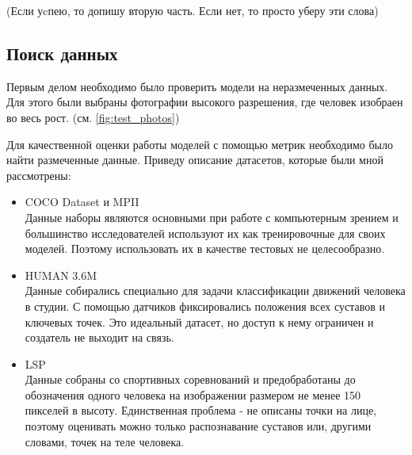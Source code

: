 (Если уcпею, то допишу вторую часть. Если нет, то просто уберу эти слова)

\subsection{Поиск данных}

Первым делом необходимо было проверить модели на неразмеченных данных. Для этого были выбраны фотографии высокого разрешения, где человек изобраен во весь рост. (см. \autoref{fig:test_photos})

Для качественной оценки работы моделей с помощью метрик необходимо было найти размеченные данные. Приведу описание датасетов, которые были мной рассмотрены:

\begin{itemize}
	\item COCO Dataset и MPII\\
	Данные наборы являются основными при работе с компьютерным зрением и большинство исследователей используют их как тренировочные для своих моделей. Поэтому использовать их в качестве тестовых не целесообразно. \cite{COCO_dataset, MPII_dataset}
	\item HUMAN 3.6M\\
	Данные собирались специально для задачи классификации движений человека в студии. С помощью датчиков фиксировались положения всех суставов и ключевых точек. Это идеальный датасет, но доступ к нему ограничен и создатель не выходит на связь. \cite{h36m_pami}
	\item LSP\\
	Данные собраны со спортивных соревнований и предобработаны до обозначения одного человека на изображении размером не менее 150 пикселей в высоту. Единственная проблема - не описаны точки на лице, поэтому оценивать можно только распознавание суставов или, другими словами, точек на теле человека. \cite{LSP}
\end{itemize}

